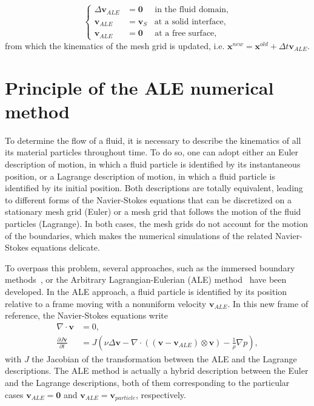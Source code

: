 \begin{equation}
  \left\{
\begin{aligned}
\Delta \mathbf{v}_{ALE} &= \mathbf{0} \;\;\;\;\; \text{in the fluid domain,}\\
\mathbf{v}_{ALE} &= \mathbf{v}_{S} \;\;\; \text{at a solid interface,}\\
\mathbf{v}_{ALE} &= \mathbf{0} \;\;\;\;\; \text{at a free surface,} 
\end{aligned}
\right.
\label{harmonic_mesh}
\end{equation}
from which the kinematics of the mesh grid is updated, i.e. ${\textbf{x}}^{new}={\textbf{x}}^{old} + \Delta t{\textbf{v}}_{ALE}$.

\section{Principle of the ALE numerical method}
To determine the flow of a fluid, it is necessary to describe the kinematics of all its material particles throughout time. To do so, one can adopt either an Euler description of motion, in which a fluid particle is identified by its instantaneous position, or a Lagrange description of motion, in which a fluid particle is identified by its initial position. 
Both descriptions are totally equivalent, leading to different forms of the Navier-Stokes equations that can be discretized on a stationary mesh grid (Euler) or a mesh grid that follows the motion of the fluid particles (Lagrange). In both cases, the mesh grids do not account for the motion of the boundaries, which makes the numerical simulations of the related Navier-Stokes equations delicate. 

To overpass this problem, several approaches, such as the immersed boundary methods~\cite{puscas2015three, puscas2015time, puscas2015conservative}, or the Arbitrary Lagrangian-Eulerian (ALE) method~\cite{donea2004arbitrary, fourestey2004second, koobus2000computation} have been developed. 
In the ALE approach, a fluid particle is identified by its position relative to a frame moving with a nonuniform velocity ${\textbf{v}}_{ALE}$. In this new frame of reference, the Navier-Stokes equations write
\begin{subequations}\label{eq:NS_ALE2}
\begin{align}
\nabla \cdot   \textbf{v} &= 0, \\
\frac{\partial J {\textbf{v}}}{\partial t}  &=  J \left(\nu\Delta {\textbf{v}}   - \nabla \cdot  ( ({\textbf{v}} - {\textbf{v}}_{ALE}) \otimes {\textbf{v}} )  - \frac{1}{\rho}\nabla p\right),
\end{align}
\end{subequations}
with $J$ the Jacobian of the transformation between the ALE and the Lagrange descriptions. The ALE method is actually a hybrid description between the Euler and the Lagrange descriptions, both of them corresponding to the particular cases ${\textbf{v}}_{ALE}={\textbf{0}}$ and ${\textbf{v}}_{ALE}={\textbf{v}}_{particle}$, respectively. 


